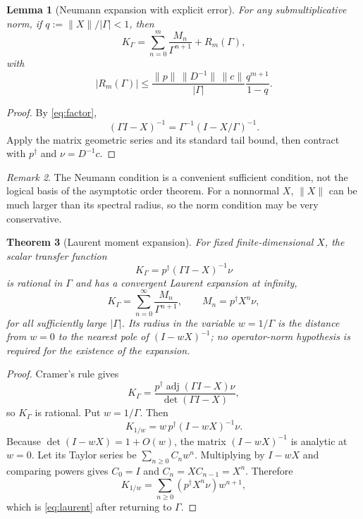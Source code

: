 \documentclass[11pt,a4paper]{article}
\newtheorem{theorem}{Theorem}[section]
\newtheorem{lemma}[theorem]{Lemma}
\theoremstyle{remark}
\newtheorem{remark}[theorem]{Remark}
\newcommand{\adj}{\operatorname{adj}}
\begin{document}
\begin{lemma}[Neumann expansion with explicit error]
\label{lem:neumann-v7}
For any submultiplicative norm, if
$q:=\|X\|/|\Gamma|<1$, then
\begin{equation}
K_\Gamma=\sum_{n=0}^{m}\frac{M_n}{\Gamma^{n+1}}+R_m(\Gamma),
\label{eq:neumann-trunc}
\end{equation}
with
\begin{equation}
|R_m(\Gamma)|\le
\frac{\|p\|\,\|D^{-1}\|\,\|c\|}{|\Gamma|}
\frac{q^{m+1}}{1-q}.
\label{eq:neumann-error}
\end{equation}
\end{lemma}

\begin{proof}
By \eqref{eq:factor},
\[
(\Gamma I-X)^{-1}=\Gamma^{-1}(I-X/\Gamma)^{-1}.
\]
Apply the matrix geometric series and its standard tail bound, then contract
with $p^\dagger$ and $\nu=D^{-1}c$.
\end{proof}

\begin{remark}
The Neumann condition is a convenient sufficient condition, not the logical
basis of the asymptotic order theorem.  For a nonnormal $X$, $\|X\|$ can be
much larger than its spectral radius, so the norm condition may be very
conservative.
\end{remark}

\begin{theorem}[Laurent moment expansion]
\label{thm:laurent}
For fixed finite-dimensional $X$, the scalar transfer function
\[
K_\Gamma=p^\dagger(\Gamma I-X)^{-1}\nu
\]
is rational in $\Gamma$ and has a convergent Laurent expansion at infinity,
\begin{equation}
K_\Gamma=\sum_{n=0}^{\infty}\frac{M_n}{\Gamma^{n+1}},
\qquad M_n=p^\dagger X^n\nu,
\label{eq:laurent}
\end{equation}
for all sufficiently large $|\Gamma|$.  Its radius in the variable
$w=1/\Gamma$ is the distance from $w=0$ to the nearest pole of
$(I-wX)^{-1}$; no operator-norm hypothesis is required for the existence of
the expansion.
\end{theorem}

\begin{proof}
Cramer's rule gives
\[
K_\Gamma=
\frac{p^\dagger\adj(\Gamma I-X)\nu}{\det(\Gamma I-X)},
\]
so $K_\Gamma$ is rational.  Put $w=1/\Gamma$.  Then
\[
K_{1/w}=w\,p^\dagger(I-wX)^{-1}\nu.
\]
Because $\det(I-wX)=1+O(w)$, the matrix $(I-wX)^{-1}$ is analytic at
$w=0$.  Let its Taylor series be $\sum_{n\ge0}C_nw^n$.  Multiplying by
$I-wX$ and comparing powers gives $C_0=I$ and $C_n=XC_{n-1}=X^n$.
Therefore
\[
K_{1/w}=\sum_{n\ge0}(p^\dagger X^n\nu)w^{n+1},
\]
which is \eqref{eq:laurent} after returning to $\Gamma$.
\end{proof}
\end{document}
